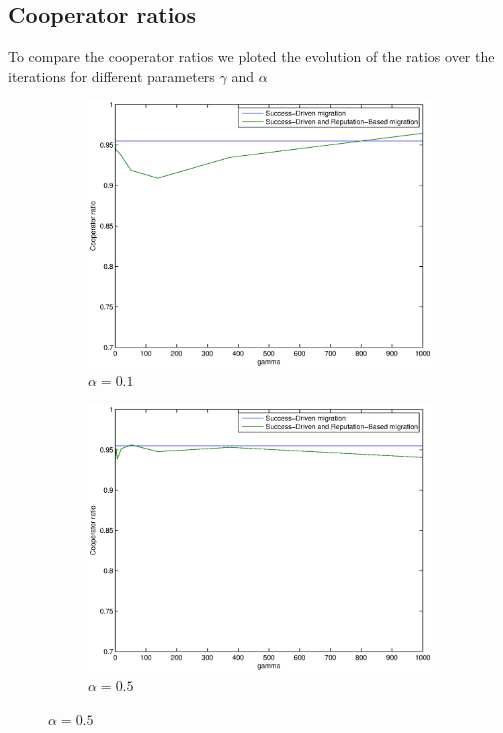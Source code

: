 \documentclass[11pt]{article}
\begin{document}
\subsection{Cooperator ratios}

To compare the cooperator ratios we ploted the evolution of the ratios over the iterations for different parameters $\gamma$ and $\alpha$

\begin{figure}
	\centering
	\begin{subfigure}[t]{0.48\textwidth}
        \includegraphics[width=\textwidth]{../../other/plots/alpha01.eps}
	\caption{$\alpha = 0.1$}
	\label{fig:cooperator_ratios_5000-1}
    	\end{subfigure}
	\begin{subfigure}[t]{0.48\textwidth}
        \includegraphics[width=\textwidth]{../../other/plots/alpha05.eps}
	\caption{$\alpha = 0.5$}
	\label{fig:cooperator_ratios_5000-2}
    	\end{subfigure}


\end{figure}
\end{document}
